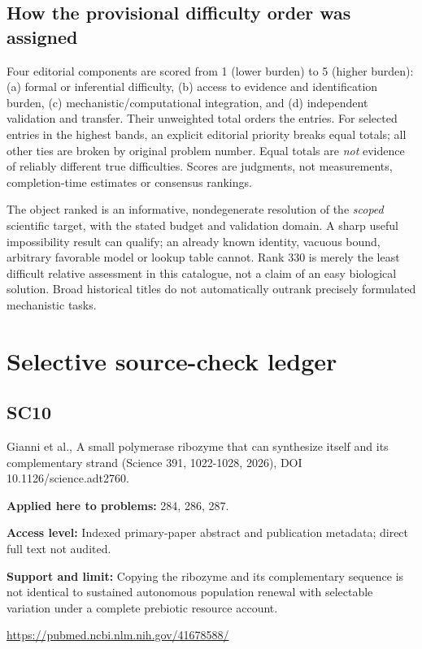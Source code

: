 \documentclass[11pt]{article}
\begin{document}
\subsection*{How the provisional difficulty order was assigned}
Four editorial components are scored from 1 (lower burden) to 5 (higher burden): (a) formal or inferential difficulty, (b) access to evidence and identification burden, (c) mechanistic/computational integration, and (d) independent validation and transfer. Their unweighted total orders the entries. For selected entries in the highest bands, an explicit editorial priority breaks equal totals; all other ties are broken by original problem number. Equal totals are \emph{not} evidence of reliably different true difficulties. Scores are judgments, not measurements, completion-time estimates or consensus rankings.

The object ranked is an informative, nondegenerate resolution of the \emph{scoped} scientific target, with the stated budget and validation domain. A sharp useful impossibility result can qualify; an already known identity, vacuous bound, arbitrary favorable model or lookup table cannot. Rank 330 is merely the least difficult relative assessment in this catalogue, not a claim of an easy biological solution. Broad historical titles do not automatically outrank precisely formulated mechanistic tasks.


\section*{Selective source-check ledger}
\subsection*{SC10}\label{check:SC10}

Gianni et al., A small polymerase ribozyme that can synthesize itself and its complementary strand (Science 391, 1022-1028, 2026), DOI 10.1126/science.adt2760.

\textbf{Applied here to problems:} 284, 286, 287.

\textbf{Access level:} Indexed primary-paper abstract and publication metadata; direct full text not audited.

\textbf{Support and limit:} Copying the ribozyme and its complementary sequence is not identical to sustained autonomous population renewal with selectable variation under a complete prebiotic resource account.

\url{https://pubmed.ncbi.nlm.nih.gov/41678588/}
\end{document}
